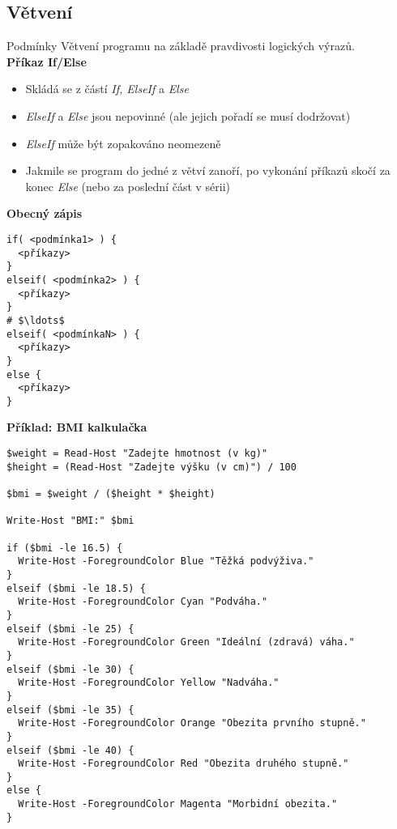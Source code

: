 \documentclass[main.tex]{subfiles}
\begin{document}
\subsection{Větvení}%
\begin{frame}{Podmínky}
  Větvení programu na základě pravdivosti logických výrazů.\\

  \textbf{Příkaz If/Else}
    \begin{itemize}
      \item Skládá se z částí \textit{If, ElseIf} a \textit{Else}
      \item \textit{ElseIf} a \textit{Else} jsou nepovinné (ale jejich pořadí se musí dodržovat)
      \item \textit{ElseIf} může být zopakováno neomezeně
      \item Jakmile se program do jedné z větví zanoří, po vykonání příkazů skočí za konec \textit{Else} (nebo za poslední část v sérii)
    \end{itemize}
    \framebreak
        \textbf{Obecný zápis}
\begin{center}
  
\begin{verbatim}
if( <podmínka1> ) {
  <příkazy>
}
elseif( <podmínka2> ) {
  <příkazy>
}
# $\ldots$
elseif( <podmínkaN> ) {
  <příkazy>
}
else {
  <příkazy>
}
    \end{verbatim}
\end{center}
 \framebreak
     \textbf{Příklad: BMI kalkulačka}
     \begin{center}
    \begin{verbatim}
$weight = Read-Host "Zadejte hmotnost (v kg)"
$height = (Read-Host "Zadejte výšku (v cm)") / 100

$bmi = $weight / ($height * $height)

Write-Host "BMI:" $bmi

if ($bmi -le 16.5) {
  Write-Host -ForegroundColor Blue "Těžká podvýživa." 
}
elseif ($bmi -le 18.5) {
  Write-Host -ForegroundColor Cyan "Podváha."
}
elseif ($bmi -le 25) {
  Write-Host -ForegroundColor Green "Ideální (zdravá) váha."
}
elseif ($bmi -le 30) {
  Write-Host -ForegroundColor Yellow "Nadváha."
}
elseif ($bmi -le 35) {
  Write-Host -ForegroundColor Orange "Obezita prvního stupně."
}
elseif ($bmi -le 40) {
  Write-Host -ForegroundColor Red "Obezita druhého stupně."
}
else {
  Write-Host -ForegroundColor Magenta "Morbidní obezita."
}


\end{verbatim}
\end{center}
\end{frame}
\end{document}
